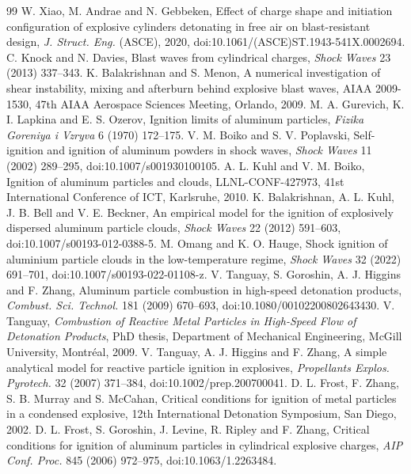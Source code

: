 \documentclass{article}
\begin{document}
\begin{thebibliography}{99}
     W. Xiao, M. Andrae and N. Gebbeken, Effect of charge shape and initiation configuration of explosive cylinders detonating in free air on blast-resistant design, \emph{J. Struct. Eng.} (ASCE), 2020, doi:10.1061/(ASCE)ST.1943-541X.0002694.
     C. Knock and N. Davies, Blast waves from cylindrical charges, \emph{Shock Waves} 23 (2013) 337--343.
     K. Balakrishnan and S. Menon, A numerical investigation of shear instability, mixing and afterburn behind explosive blast waves, AIAA 2009-1530, 47th AIAA Aerospace Sciences Meeting, Orlando, 2009.
     M. A. Gurevich, K. I. Lapkina and E. S. Ozerov, Ignition limits of aluminum particles, \emph{Fizika Goreniya i Vzryva} 6 (1970) 172--175.
     V. M. Boiko and S. V. Poplavski, Self-ignition and ignition of aluminum powders in shock waves, \emph{Shock Waves} 11 (2002) 289--295, doi:10.1007/s001930100105.
     A. L. Kuhl and V. M. Boiko, Ignition of aluminum particles and clouds, LLNL-CONF-427973, 41st International Conference of ICT, Karlsruhe, 2010.
     K. Balakrishnan, A. L. Kuhl, J. B. Bell and V. E. Beckner, An empirical model for the ignition of explosively dispersed aluminum particle clouds, \emph{Shock Waves} 22 (2012) 591--603, doi:10.1007/s00193-012-0388-5.
     M. Omang and K. O. Hauge, Shock ignition of aluminium particle clouds in the low-temperature regime, \emph{Shock Waves} 32 (2022) 691--701, doi:10.1007/s00193-022-01108-z.
     V. Tanguay, S. Goroshin, A. J. Higgins and F. Zhang, Aluminum particle combustion in high-speed detonation products, \emph{Combust. Sci. Technol.} 181 (2009) 670--693, doi:10.1080/00102200802643430.
     V. Tanguay, \emph{Combustion of Reactive Metal Particles in High-Speed Flow of Detonation Products}, PhD thesis, Department of Mechanical Engineering, McGill University, Montr\'eal, 2009.
     V. Tanguay, A. J. Higgins and F. Zhang, A simple analytical model for reactive particle ignition in explosives, \emph{Propellants Explos. Pyrotech.} 32 (2007) 371--384, doi:10.1002/prep.200700041.
     D. L. Frost, F. Zhang, S. B. Murray and S. McCahan, Critical conditions for ignition of metal particles in a condensed explosive, 12th International Detonation Symposium, San Diego, 2002.
     D. L. Frost, S. Goroshin, J. Levine, R. Ripley and F. Zhang, Critical conditions for ignition of aluminum particles in cylindrical explosive charges, \emph{AIP Conf. Proc.} 845 (2006) 972--975, doi:10.1063/1.2263484.

\end{thebibliography}
\end{document}
